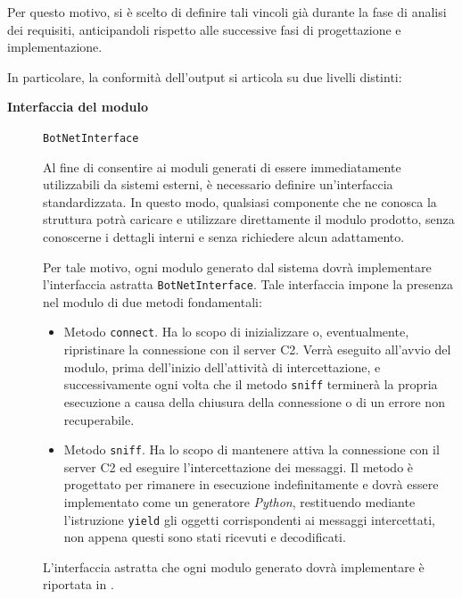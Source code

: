 Per questo motivo, si è scelto di definire tali vincoli già durante la fase di analisi dei requisiti, anticipandoli rispetto alle successive fasi di progettazione e implementazione.

In particolare, la conformità dell'output si articola su due livelli distinti:

\begin{description}
    \item[\textbf{Interfaccia del modulo}] \hspace{1em} \texttt{BotNetInterface}
    
    Al fine di consentire ai moduli generati di essere immediatamente utilizzabili da sistemi esterni, è necessario definire un'interfaccia standardizzata. In questo modo, qualsiasi componente che ne conosca la struttura potrà caricare e utilizzare direttamente il modulo prodotto, senza conoscerne i dettagli interni e senza richiedere alcun adattamento.

    Per tale motivo, ogni modulo generato dal sistema dovrà implementare l'interfaccia astratta \texttt{BotNetInterface}. Tale interfaccia impone la presenza nel modulo di due metodi fondamentali:
    
    \begin{itemize}
        \item Metodo \texttt{connect}. Ha lo scopo di inizializzare o, eventualmente, ripristinare la connessione con il server C2. Verrà eseguito all'avvio del modulo, prima dell'inizio dell'attività di intercettazione, e successivamente ogni volta che il metodo \texttt{sniff} terminerà la propria esecuzione a causa della chiusura della connessione o di un errore non recuperabile.
        \item Metodo \texttt{sniff}. Ha lo scopo di mantenere attiva la connessione con il server C2 ed eseguire l'intercettazione dei messaggi. Il metodo è progettato per rimanere in esecuzione indefinitamente e dovrà essere implementato come un generatore \textit{Python}, restituendo mediante l'istruzione \texttt{yield} gli oggetti corrispondenti ai messaggi intercettati, non appena questi sono stati ricevuti e decodificati.
    \end{itemize}

    L'interfaccia astratta che ogni modulo generato dovrà implementare è riportata in .


\end{description}
